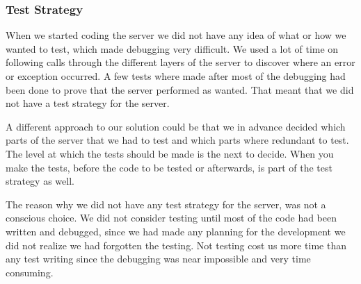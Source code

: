 \subsubsection{Test Strategy}
When we started coding the server we did not have any idea of what or how we wanted to test, which made debugging very difficult. We used a lot of time on following calls through the different layers of the server to discover where an error or exception occurred. A few tests where made after most of the debugging had been done to prove that the server performed as wanted. That meant that we did not have a test strategy for the server.

A different approach to our solution could be that we in advance decided which parts of the server that we had to test and which parts where redundant to test. The level at which the tests should be made is the next to decide. When you make the tests, before the code to be tested or afterwards, is part of the test strategy as well.

The reason why we did not have any test strategy for the server, was not a conscious choice. We did not consider testing until most of the code had been written and debugged, since we had made any planning for the development we did not realize we had forgotten the testing. Not testing cost us more time than any test writing since the debugging was near impossible and very time consuming.